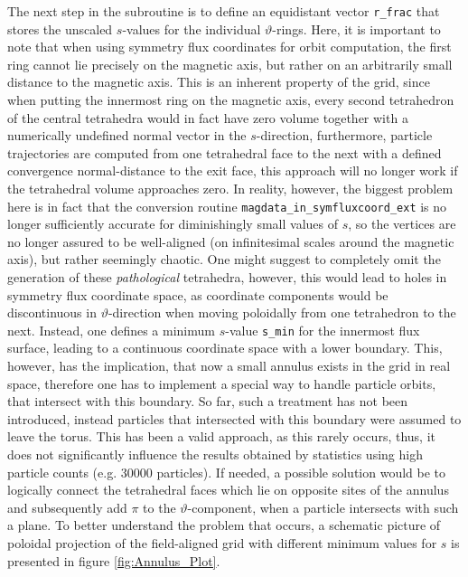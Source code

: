 \documentclass[./main.tex]{subfiles}
\begin{document}
The next step in the subroutine is to define an equidistant vector \texttt{r\_frac} that stores the unscaled $s$-values for the individual $\vartheta$-rings. Here, it is important to note that when using symmetry flux coordinates for orbit computation, the first ring cannot lie precisely on the magnetic axis, but rather on an arbitrarily small distance to the magnetic axis. This is an inherent property of the grid, since when putting the innermost ring on the magnetic axis, every second tetrahedron of the central tetrahedra would in fact have zero volume together with a numerically undefined normal vector in the $s$-direction, furthermore, particle trajectories are computed from one tetrahedral face to the next with a defined convergence normal-distance to the exit face, this approach will no longer work if the tetrahedral volume approaches zero. In reality, however, the biggest problem here is in fact that the conversion routine \texttt{magdata\_in\_symfluxcoord\_ext} is no longer sufficiently accurate for diminishingly small values of $s$, so the vertices are no longer assured to be well-aligned (on infinitesimal scales around the magnetic axis), but rather seemingly chaotic. One might suggest to completely omit the generation of these \textit{pathological} tetrahedra, however, this would lead to holes in symmetry flux coordinate space, as coordinate components would be discontinuous in $\vartheta$-direction when moving poloidally from one tetrahedron to the next. Instead, one defines a minimum $s$-value \texttt{s\_min} for the innermost flux surface, leading to a continuous coordinate space with a lower boundary. This, however, has the implication, that now a small annulus exists in the grid in real space, therefore one has to implement a special way to handle particle orbits, that intersect with this boundary. So far, such a treatment has not been introduced, instead particles that intersected with this boundary were assumed to leave the torus. This has been a valid approach, as this rarely occurs, thus, it does not significantly influence the results obtained by statistics using high particle counts (e.g. 30000 particles). If needed, a possible solution would be to logically connect the tetrahedral faces which lie on opposite sites of the annulus and subsequently add $\pi$ to the $\vartheta$-component, when a particle intersects with such a plane. To better understand the problem that occurs, a schematic picture of poloidal projection of the field-aligned grid with different minimum values for $s$ is presented in figure \ref{fig:Annulus_Plot}.
\end{document}
